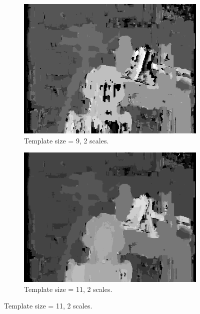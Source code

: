 \documentclass[12pt,a4paper,oneside,final]{article}
\begin{document}
\begin{figure}[H]
\begin{subfigure}[b]{0.24\textwidth}
	\includegraphics[width=\textwidth]{disparity_s2_k9.png}
	\caption{Template size = 9, 2 scales.}
\end{subfigure}
\begin{subfigure}[b]{0.24\textwidth}
	\includegraphics[width=\textwidth]{disparity_s2_k11.png}
	\caption{Template size = 11, 2 scales.}
\end{subfigure}
\end{figure}
\end{document}

